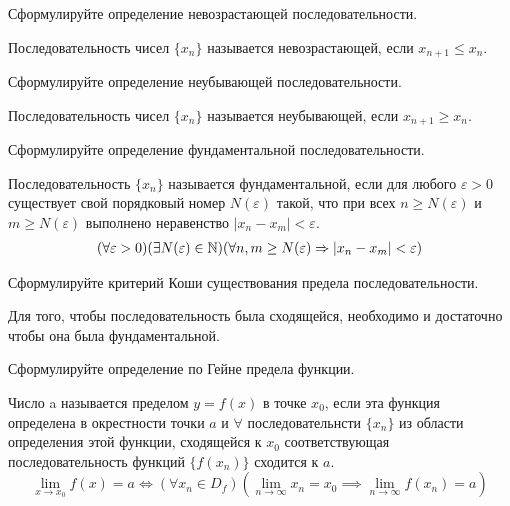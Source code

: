 \begin{question}
  Сформулируйте определение невозрастающей последовательности.
\end{question}
\begin{answer}
  Последовательность чисел $\{x_{n}\}$ называется невозрастающей, если $x_{n+1} \le x_{n}$.
\end{answer}

\begin{question}
  Сформулируйте определение неубывающей последовательности.
\end{question}
\begin{answer}
  Последовательность чисел $\{x_{n}\}$ называется неубывающей, если $x_{n+1} \ge x_{n}$.
\end{answer}

\begin{question}
  Сформулируйте определение фундаментальной последовательности.
\end{question}
\begin{answer}
  Последовательность $\{x_{n}\}$ называется фундаментальной, если для любого $\varepsilon > 0$ существует свой порядковый номер $N(\varepsilon)$ такой, что при всех $n \ge N(\varepsilon)$ и $m \ge N(\varepsilon)$ выполнено неравенство $|x_{n} - x_{m}| < \varepsilon$. 
  \begin{gather*}
    (\forall \varepsilon > 0)(\exists N(\varepsilon) \in \mathbb{N})(\forall n, m \ge N(\varepsilon) \Rightarrow |x_{n} - x_{m}| < \varepsilon)
  \end{gather*}
\end{answer}

\begin{question}
  Сформулируйте критерий Коши существования предела последовательности.
\end{question}
\begin{answer}
  Для того, чтобы последовательность была сходящейся, необходимо и достаточно чтобы она была фундаментальной.
\end{answer}

\begin{question}
  Сформулируйте определение по Гейне предела функции.
\end{question}
\begin{answer}
  Число a называется пределом $y=f(x)$ в точке $x_0$, если эта функция определена в окрестности точки $a$ и $\forall$ последовательнсти $\{x_n\}$ из области определения этой функции, сходящейся к $x_0$ соответствующая последовательность функций $\{f(x_{n})\}$ сходится к $a$. \[
    \lim_{x \to x_0} f(x) = a \iff (\forall x_{n} \in D_f)(\lim_{n \to \infty} x_{n} = x_{0} \implies \lim_{n \to \infty} f(x_{n}) = a)
\] 
\end{answer}

